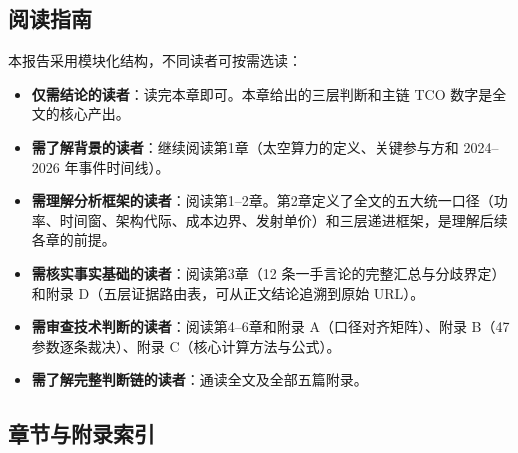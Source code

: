 \subsection*{阅读指南}

本报告采用模块化结构，不同读者可按需选读：

\begin{itemize}[leftmargin=*]
    \item \textbf{仅需结论的读者}：读完本章即可。本章给出的三层判断和主链 TCO 数字是全文的核心产出。
    \item \textbf{需了解背景的读者}：继续阅读第1章（太空算力的定义、关键参与方和 2024--2026 年事件时间线）。
    \item \textbf{需理解分析框架的读者}：阅读第1--2章。第2章定义了全文的五大统一口径（功率、时间窗、架构代际、成本边界、发射单价）和三层递进框架，是理解后续各章的前提。
    \item \textbf{需核实事实基础的读者}：阅读第3章（12 条一手言论的完整汇总与分歧界定）和附录 D（五层证据路由表，可从正文结论追溯到原始 URL）。
    \item \textbf{需审查技术判断的读者}：阅读第4--6章和附录 A（口径对齐矩阵）、附录 B（47 参数逐条裁决）、附录 C（核心计算方法与公式）。
    \item \textbf{需了解完整判断链的读者}：通读全文及全部五篇附录。
\end{itemize}

\subsection*{章节与附录索引}

